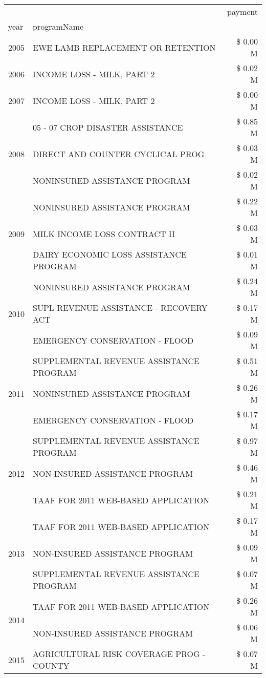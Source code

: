 \begin{tabular}{llr}
\toprule
 &  & payment \\
year & programName &  \\
\midrule
2005 & EWE LAMB REPLACEMENT OR RETENTION & \$ 0.00 M \\
\cline{1-3}
2006 & INCOME LOSS - MILK, PART 2 & \$ 0.02 M \\
\cline{1-3}
2007 & INCOME LOSS - MILK, PART 2 & \$ 0.00 M \\
\cline{1-3}
\multirow[t]{3}{*}{2008} & 05 - 07 CROP DISASTER ASSISTANCE & \$ 0.85 M \\
 & DIRECT AND COUNTER CYCLICAL PROG & \$ 0.03 M \\
 & NONINSURED ASSISTANCE PROGRAM & \$ 0.02 M \\
\cline{1-3}
\multirow[t]{3}{*}{2009} & NONINSURED ASSISTANCE PROGRAM & \$ 0.22 M \\
 & MILK INCOME LOSS CONTRACT II & \$ 0.03 M \\
 & DAIRY ECONOMIC LOSS ASSISTANCE PROGRAM & \$ 0.01 M \\
\cline{1-3}
\multirow[t]{3}{*}{2010} & NONINSURED ASSISTANCE PROGRAM & \$ 0.24 M \\
 & SUPL REVENUE ASSISTANCE - RECOVERY ACT & \$ 0.17 M \\
 & EMERGENCY CONSERVATION - FLOOD & \$ 0.09 M \\
\cline{1-3}
\multirow[t]{3}{*}{2011} & SUPPLEMENTAL REVENUE ASSISTANCE PROGRAM & \$ 0.51 M \\
 & NONINSURED ASSISTANCE PROGRAM & \$ 0.26 M \\
 & EMERGENCY CONSERVATION - FLOOD & \$ 0.17 M \\
\cline{1-3}
\multirow[t]{3}{*}{2012} & SUPPLEMENTAL REVENUE ASSISTANCE PROGRAM & \$ 0.97 M \\
 & NON-INSURED ASSISTANCE PROGRAM & \$ 0.46 M \\
 & TAAF FOR 2011 WEB-BASED APPLICATION & \$ 0.21 M \\
\cline{1-3}
\multirow[t]{3}{*}{2013} & TAAF FOR 2011 WEB-BASED APPLICATION & \$ 0.17 M \\
 & NON-INSURED ASSISTANCE PROGRAM & \$ 0.09 M \\
 & SUPPLEMENTAL REVENUE ASSISTANCE PROGRAM & \$ 0.07 M \\
\cline{1-3}
\multirow[t]{2}{*}{2014} & TAAF FOR 2011 WEB-BASED APPLICATION & \$ 0.26 M \\
 & NON-INSURED ASSISTANCE PROGRAM & \$ 0.06 M \\
\cline{1-3}
\multirow[t]{3}{*}{2015} & AGRICULTURAL RISK COVERAGE PROG - COUNTY & \$ 0.07 M \\

\end{tabular}
